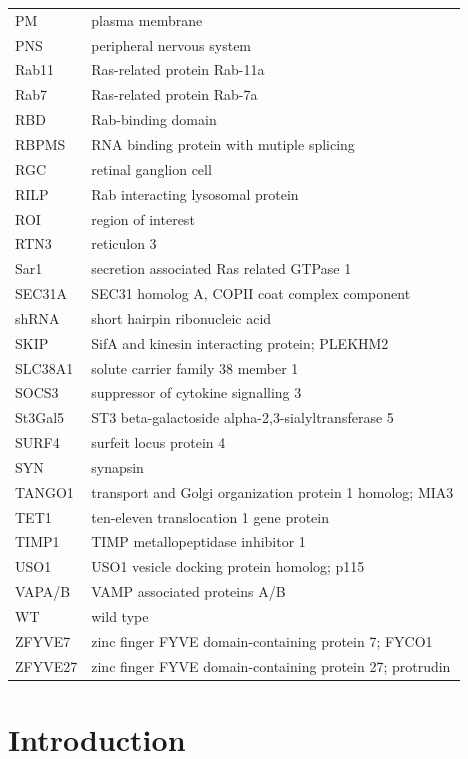 \documentclass[
  12pt,
  a4paper,
]{book}
\begin{document}
\begin{longtable}[]{@{}
  >{\raggedright\arraybackslash}p{}
  >{\raggedright\arraybackslash}p{}@{}}
PM & plasma membrane \\
PNS & peripheral nervous system \\
Rab11 & Ras-related protein Rab-11a \\
Rab7 & Ras-related protein Rab-7a \\
RBD & Rab-binding domain \\
RBPMS & RNA binding protein with mutiple splicing \\
RGC & retinal ganglion cell \\
RILP & Rab interacting lysosomal protein \\
ROI & region of interest \\
RTN3 & reticulon 3 \\
Sar1 & secretion associated Ras related GTPase 1 \\
SEC31A & SEC31 homolog A, COPII coat complex component \\
shRNA & short hairpin ribonucleic acid \\
SKIP & SifA and kinesin interacting protein; PLEKHM2 \\
SLC38A1 & solute carrier family 38 member 1 \\
SOCS3 & suppressor of cytokine signalling 3 \\
St3Gal5 & ST3 beta-galactoside alpha-2,3-sialyltransferase 5 \\
SURF4 & surfeit locus protein 4 \\
SYN & synapsin \\
TANGO1 & transport and Golgi organization protein 1 homolog; MIA3 \\
TET1 & ten-eleven translocation 1 gene protein \\
TIMP1 & TIMP metallopeptidase inhibitor 1 \\
USO1 & USO1 vesicle docking protein homolog; p115 \\
VAPA/B & VAMP associated proteins A/B \\
WT & wild type \\
ZFYVE7 & zinc finger FYVE domain-containing protein 7; FYCO1 \\
ZFYVE27 & zinc finger FYVE domain-containing protein 27; protrudin \\
\bottomrule()
\end{longtable}

\hypertarget{INTRODUCTION}{%
\chapter*{Introduction}\label{INTRODUCTION}}
\end{document}
